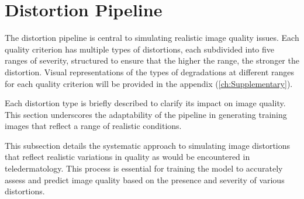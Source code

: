 \section{Distortion Pipeline}
\label{sec:DistPipeline}
The distortion pipeline is central to simulating realistic image quality issues. Each quality criterion has multiple types of distortions, each subdivided into five ranges of severity, structured to ensure that the higher the range, the stronger the distortion. Visual representations of the types of degradations at different ranges for each quality criterion will be provided in the appendix (\autoref{ch:Supplementary}).  \par
Each distortion type is briefly described to clarify its impact on image quality. This section underscores the adaptability of the pipeline in generating training images that reflect a range of realistic conditions. \par
\vspace{\baselineskip}
\noindent
This subsection details the systematic approach to simulating image distortions that reflect realistic variations in quality as would be encountered in teledermatology. This process is essential for training the model to accurately assess and predict image quality based on the presence and severity of various distortions.\par
\vspace{\baselineskip}
\noindent


